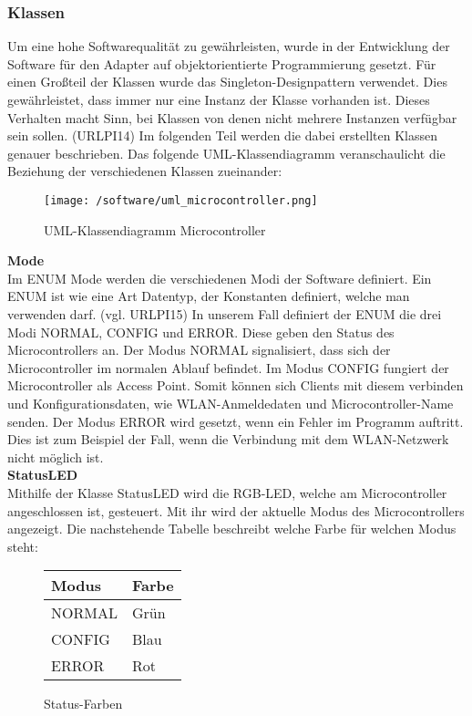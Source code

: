\documentclass[]{article}
\begin{document}
\subsubsection{Klassen}
Um eine hohe Softwarequalität zu gewährleisten, wurde in der Entwicklung der Software für den Adapter auf objektorientierte Programmierung gesetzt. Für einen Großteil der Klassen wurde das Singleton-Designpattern verwendet. Dies gewährleistet, dass immer nur eine Instanz der Klasse vorhanden ist. Dieses Verhalten macht Sinn, bei Klassen von denen nicht mehrere Instanzen verfügbar sein sollen. (URLPI14) Im folgenden Teil werden die dabei erstellten Klassen genauer beschrieben. Das folgende UML-Klassendiagramm veranschaulicht die Beziehung der verschiedenen Klassen zueinander:
\begin{figure}[H]
\texttt{[image: /software/uml\_microcontroller.png]}
\caption{UML-Klassendiagramm Microcontroller}
\end{figure}
\textbf{Mode} \\
Im ENUM Mode werden die verschiedenen Modi der Software definiert. Ein ENUM ist wie eine Art Datentyp, der Konstanten definiert, welche man verwenden darf. (vgl. URLPI15)  In unserem Fall definiert der ENUM die drei Modi NORMAL, CONFIG und ERROR. Diese geben den Status des Microcontrollers an. Der Modus NORMAL signalisiert, dass sich der Microcontroller im normalen Ablauf befindet. Im Modus CONFIG fungiert der Microcontroller als Access Point. Somit können sich Clients mit diesem verbinden und Konfigurationsdaten, wie WLAN-Anmeldedaten und Microcontroller-Name senden. Der Modus ERROR wird gesetzt, wenn ein Fehler im Programm auftritt. Dies ist zum Beispiel der Fall, wenn die Verbindung mit dem WLAN-Netzwerk nicht möglich ist. \newline \\
\textbf{StatusLED} \\
Mithilfe der Klasse StatusLED wird die RGB-LED, welche am Microcontroller angeschlossen ist, gesteuert. Mit ihr wird der aktuelle Modus des Microcontrollers angezeigt. Die nachstehende Tabelle beschreibt welche Farbe für welchen Modus steht: \newline \\
\begin{figure}[H]
\begin{tabular}{|l|l|}
\hline
\textbf{Modus} & \textbf{Farbe} \\
\hline
NORMAL & Grün \\
\hline
CONFIG & Blau \\
\hline
ERROR & Rot \\
\hline
\end{tabular}
\caption{Status-Farben}
\end{figure}
\end{document}
